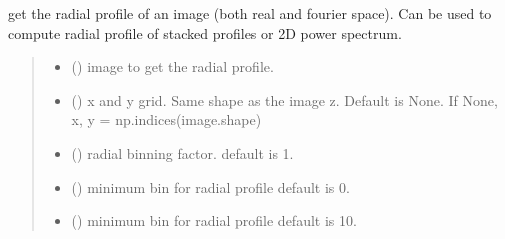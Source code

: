 \documentclass[letterpaper,10pt,english]{sphinxmanual}
\begin{document}
\begin{fulllineitems}
\label{\detokenize{flatsky:flatsky.radial_profile}}
\pysigstartsignatures
{}
\pysigstopsignatures
\sphinxAtStartPar
get the radial profile of an image (both real and fourier space).
Can be used to compute radial profile of stacked profiles or 2D power spectrum.
\begin{quote}\begin{description}
\begin{itemize}
\item {} 
\sphinxAtStartPar
{} () \textendash{} image to get the radial profile.

\item {} 
\sphinxAtStartPar
{} () \textendash{} x and y grid. Same shape as the image z.
Default is None.
If None,
x, y = np.indices(image.shape)

\item {} 
\sphinxAtStartPar
{} () \textendash{} radial binning factor.
default is 1.

\item {} 
\sphinxAtStartPar
{} () \textendash{} minimum bin for radial profile
default is 0.

\item {} 
\sphinxAtStartPar
{} () \textendash{} minimum bin for radial profile
default is 10.


\end{itemize}
\end{description}
\end{quote}
\end{fulllineitems}
\end{document}
